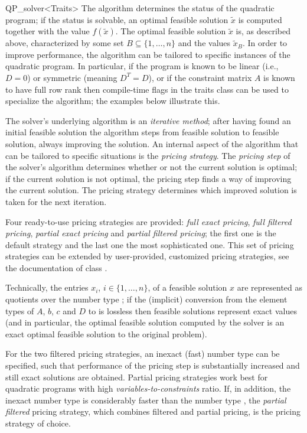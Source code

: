 \begin{ccRefClass}{QP_solver<Traits>}
The algorithm determines the status of the quadratic program; if the
status is solvable, an optimal feasible solution $\tilde{x}$ is
computed together with the value $f(\tilde{x})$.  The optimal feasible
solution $\tilde{x}$ is, as described above, characterized by some set
$B \subseteq \{1,\ldots,n\}$ and the values $\tilde{x}_{B}$.  In order
to improve performance, the algorithm can be tailored to specific
instances of the quadratic program.  In particular, if the program is
known to be linear (i.e., $D=0$) or symmetric (meaning $D^{T}=D$), or
if the constraint matrix $A$ is known to have full row rank then
compile-time flags in the traits class  can be used to
specialize the algorithm; the examples below illustrate this.

The solver's underlying algorithm is an \emph{iterative method}; after
having found an initial feasible solution the algorithm steps from
feasible solution to feasible solution, always improving the solution.
An internal aspect of the algorithm that can be tailored to specific
situations is the \emph{pricing strategy}.  The \emph{pricing step} of
the solver's algorithm determines whether or not the current solution
is optimal; if the current solution is not optimal, the pricing step
finds a way of improving the current solution. The pricing strategy
determines which improved solution is taken for the next iteration.

Four ready-to-use pricing strategies are provided: \emph{full exact
pricing}, \emph{full filtered pricing}, \emph{partial exact pricing}
and \emph{partial filtered pricing}; the first one is the default
strategy and the last one the most sophisticated one.  This set of
pricing strategies can be extended by user-provided, customized
pricing strategies, see the documentation of class
.

Technically, the entries $x_i$, $i\in\{1,\ldots,n\}$, of a feasible
solution $x$ are represented as quotients over the number type
; if the (implicit) conversion from the element types of $A$,
$b$, $c$ and $D$ to  is lossless then feasible solutions
represent exact values (and in particular, the optimal feasible
solution computed by the solver is an exact optimal feasible solution
to the original problem).

For the two filtered pricing strategies, an inexact (fast) number type
 can be specified, such that performance of the pricing step
is substantially increased and still exact solutions are obtained.
Partial pricing strategies work best for quadratic programs with high
\emph{variables-to-constraints} ratio.  If, in addition, the inexact
number type  is considerably faster than the number type
, the \emph{partial filtered} pricing strategy, which combines
filtered and partial pricing, is the pricing strategy of choice.
   


\end{ccRefClass}
